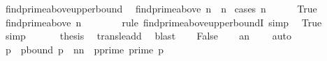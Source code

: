 \begin{isabellebody}
%
\endisatagproof
{\isafoldproof}%
%
\isadelimproof
\isanewline
%
\endisadelimproof
\isanewline
{}\isamarkupfalse%
\ find{\isacharunderscore}{\kern0pt}prime{\isacharunderscore}{\kern0pt}above{\isacharunderscore}{\kern0pt}upper{\isacharunderscore}{\kern0pt}bound{\isacharcolon}{\kern0pt}\isanewline
\ \ {\isachardoublequoteopen}find{\isacharunderscore}{\kern0pt}prime{\isacharunderscore}{\kern0pt}above\ n\ {\isasymle}\ {}{\isacharasterisk}{\kern0pt}n{\isacharplus}{\kern0pt}{}{\isachardoublequoteclose}\isanewline
%
\isadelimproof
%
\endisadelimproof
%
\isatagproof
{}\isamarkupfalse%
\ {\isacharparenleft}{\kern0pt}cases\ {\isachardoublequoteopen}n\ {\isasymle}\ {}{\isachardoublequoteclose}{\isacharparenright}{\kern0pt}\isanewline
\ \ \isamarkupfalse%
\ True\isanewline
\ \ \isamarkupfalse%
\ {\isachardoublequoteopen}find{\isacharunderscore}{\kern0pt}prime{\isacharunderscore}{\kern0pt}above\ n\ {\isasymle}\ {}{\isachardoublequoteclose}\isanewline
\ \ \ \ \isamarkupfalse%
\ {\isacharparenleft}{\kern0pt}rule\ find{\isacharunderscore}{\kern0pt}prime{\isacharunderscore}{\kern0pt}above{\isacharunderscore}{\kern0pt}upper{\isacharunderscore}{\kern0pt}boundI{\isacharcomma}{\kern0pt}\ simp{\isacharparenright}{\kern0pt}\ \isamarkupfalse%
\ True\ \isamarkupfalse%
\ simp\ \isanewline
\ \ \isamarkupfalse%
\ \isamarkupfalse%
\ {\isacharquery}{\kern0pt}thesis\ \isamarkupfalse%
\ trans{\isacharunderscore}{\kern0pt}le{\isacharunderscore}{\kern0pt}add{}\ \isamarkupfalse%
\ blast\isanewline
{}\isamarkupfalse%
\isanewline
\ \ \isamarkupfalse%
\ False\isanewline
\ \ \isamarkupfalse%
\ a{\isacharcolon}{\kern0pt}{\isachardoublequoteopen}n\ {\isachargreater}{\kern0pt}\ {}{\isachardoublequoteclose}\ \isamarkupfalse%
\ auto\isanewline
\ \ \isamarkupfalse%
\ \isamarkupfalse%
\ p\ \ p{\isacharunderscore}{\kern0pt}bound{\isacharcolon}{\kern0pt}\ {\isachardoublequoteopen}p\ {\isasymin}\ {\isacharbraceleft}{\kern0pt}n{\isacharless}{\kern0pt}{\isachardot}{\kern0pt}{\isachardot}{\kern0pt}{\isacharless}{\kern0pt}{}{\isacharasterisk}{\kern0pt}n{\isacharbraceright}{\kern0pt}{\isachardoublequoteclose}\ \ p{\isacharunderscore}{\kern0pt}prime{\isacharcolon}{\kern0pt}\ {\isachardoublequoteopen}prime\ p{\isachardoublequoteclose}\ \isanewline

\end{isabellebody}
